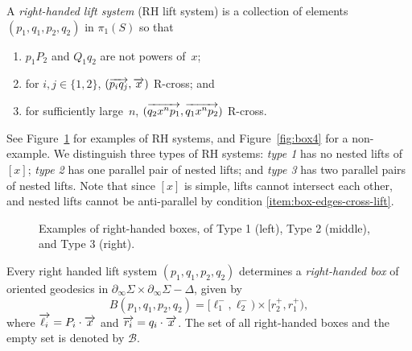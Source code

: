 \begin{definition}\label{def:RH-lift-system}
  A \emph{right-handed lift system} (RH lift system) is a collection of elements $(p_1,q_1,p_2,q_2)$ in $\pi_1(S)$ so that
  \begin{enumerate}
  \item\label{item:box-nontriv-lift} $p_1P_2$ and $Q_1q_2$ are not powers of~$x$;
  \item\label{item:box-edges-cross-lift} for $i,j \in \{1,2\}$,
    $(\overrightarrow{p_iq_j},\overrightarrow{x})$ R-cross; and
  \item\label{item:box-diags-cross-lift} for sufficiently large~$n$, $(\overrightarrow{q_2x^np_1},\overrightarrow{q_1x^np_2})$ R-cross.
  \end{enumerate}
\end{definition}
See Figure~\ref{fig:rhbox} for examples of
RH systems, and Figure~\ref{fig:box4} for a non-example.
 We
distinguish three types of RH systems: \emph{type 1} has
no nested lifts of $[x]$; \emph{type 2} has one parallel pair of nested lifts; and
\emph{type 3} has two parallel pairs of nested lifts.
Note that since $[x]$ is simple, lifts
cannot intersect each other, and nested lifts cannot be anti-parallel
by condition \ref{item:box-edges-cross-lift}.

\begin{figure}
     \centering
{}
\quad
\quad
{}
     \caption{Examples of right-handed boxes, of Type 1 (left), Type 2
     (middle), and Type 3 (right).}
     \label{fig:rhbox}
\end{figure}

\begin{figure}
\end{figure}

\begin{definition}\label{def:RH-box}
  Every right handed lift system $(p_1,q_1,p_2,q_2)$ determines a \emph{right-handed box} of oriented geodesics in $\partial_{\infty} \Sigma \times \partial_{\infty} \Sigma - \Delta$,  given by \[
  B(p_1,q_1,p_2,q_2)=[\ell_1^-,\ell_2^-) \times [r_2^+,r_1^+),\] where $\overrightarrow{\ell_i} = P_i \cdot \overrightarrow{x}$ and $\overrightarrow{r_i} = q_i \cdot \overrightarrow{x}$.
The set of all right-handed boxes and the empty set is denoted by $\mathcal{B}$.
\end{definition}

